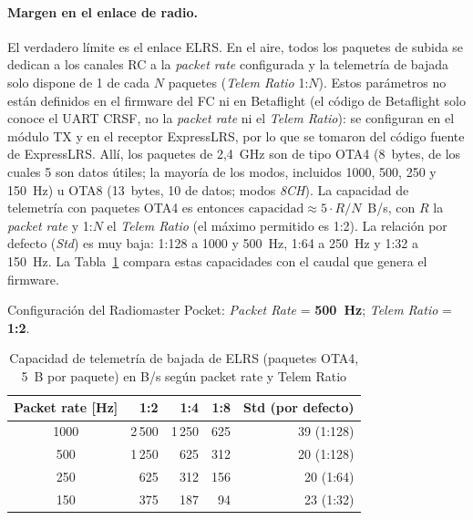 \documentclass[12pt, letterpaper]{report}
\begin{document}
\paragraph{Margen en el enlace de radio.} El verdadero límite es el enlace ELRS. En el aire, todos los paquetes de subida se dedican a los canales RC a la \textit{packet rate} configurada y la telemetría de bajada solo dispone de 1 de cada $N$ paquetes (\textit{Telem Ratio} 1:$N$). Estos parámetros no están definidos en el firmware del FC ni en Betaflight (el código de Betaflight solo conoce el UART CRSF, no la \textit{packet rate} ni el \textit{Telem Ratio}): se configuran en el módulo TX y en el receptor ExpressLRS, por lo que se tomaron del código fuente de ExpressLRS. Allí, los paquetes de 2,4~GHz son de tipo OTA4 (8~bytes, de los cuales 5 son datos útiles; la mayoría de los modos, incluidos 1000, 500, 250 y 150~Hz) u OTA8 (13~bytes, 10 de datos; modos \textit{8CH}). La capacidad de telemetría con paquetes OTA4 es entonces $\text{capacidad} \approx 5\cdot R/N$~B/s, con $R$ la \textit{packet rate} y 1:$N$ el \textit{Telem Ratio} (el máximo permitido es 1:2). La relación por defecto (\textit{Std}) es muy baja: 1:128 a 1000 y 500~Hz, 1:64 a 250~Hz y 1:32 a 150~Hz. La Tabla~\ref{tab:margen_radio} compara estas capacidades con el caudal que genera el firmware.

\begin{center}
Configuración del Radiomaster Pocket: \textit{Packet Rate} = \textbf{500~Hz}; \textit{Telem Ratio} = \textbf{1:2}.
\end{center}

\begin{table}[htbp]
\centering
\caption{Capacidad de telemetría de bajada de ELRS (paquetes OTA4, 5~B por paquete) en B/s según packet rate y Telem Ratio}
\label{tab:margen_radio}
\renewcommand{\arraystretch}{1.25}
\small
\begin{tabular}{@{}c r r r r@{}}
\toprule
\rowcolor{gray!20}
\textbf{Packet rate [Hz]} & \textbf{1:2} & \textbf{1:4} & \textbf{1:8} & \textbf{Std (por defecto)} \\
\midrule
1000 & 2\,500 & 1\,250 & 625 & 39 (1:128) \\
500 & 1\,250 & 625 & 312 & 20 (1:128) \\
250 & 625 & 312 & 156 & 20 (1:64) \\
150 & 375 & 187 & 94 & 23 (1:32) \\
\bottomrule
\end{tabular}
\end{table}
\end{document}
